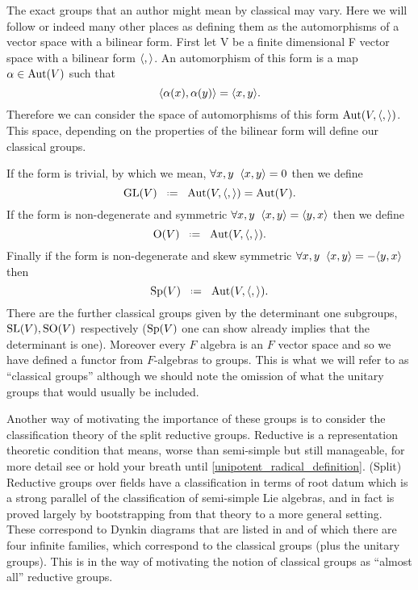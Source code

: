 The exact groups that an author might mean by classical may vary. Here we will follow \cite[\S 13]{CliffordAlgebrasClassical} or indeed many other places as defining them as the automorphisms of a vector space with a bilinear form. First let V be a finite dimensional F vector space with a bilinear form \(\langle ,\rangle\). An automorphism of this form is a map \(\alpha\in \operatorname{Aut}(V)\) such that 
\[\langle \alpha(x), \alpha(y)\rangle = \langle x,y\rangle.\]
Therefore we can consider the space of automorphisms of this form \(\operatorname{Aut}(V, \langle ,\rangle)\). This space, depending on the properties of the bilinear form will define our classical groups. 

If the form is trivial, by which we mean, \(\forall x,y \;\; \langle x, y\rangle = 0\) then we define 
\[\GL(V) \defeq \Aut(V, \inner{,}) = \Aut(V).\]
If the form is non-degenerate and symmetric \(\forall x,y \;\; \langle x, y\rangle = \langle y,x\rangle\) then we define
\[\mathrm{O}(V) \defeq \Aut(V, \inner{,}).\]
Finally if the form is non-degenerate and skew symmetric \(\forall x,y \;\; \langle x, y\rangle = -\langle y,x\rangle\) then 
\[\Sp(V) \defeq \Aut(V, \inner{,}).\]
There are the further classical groups given by the determinant one subgroups, \(\operatorname{SL}(V), \mathrm{SO}(V)\) respectively (\(\operatorname{Sp}(V)\) one can show already implies that the determinant is one). Moreover every \(F\) algebra is an \(F\) vector space and so we have defined a functor from \(F\)-algebras to groups. This is what we will refer to as ``classical groups'' although we should note the omission of what the unitary groups that  would usually be included.

Another way of motivating the importance of these groups is to consider the classification theory of the split reductive groups. Reductive is a representation theoretic condition that means, worse than semi-simple but still manageable, for more detail see \cite[22.138]{milneAlgebraicGroupsTheory2017} or hold your breath until \ref{unipotent_radical_definition}. (Split) Reductive groups over fields have a classification in terms of root datum \cite[22.48]{milneAlgebraicGroupsTheory2017} which is a strong parallel of the classification of semi-simple Lie algebras, and in fact is proved largely by bootstrapping from that theory to a more general setting. These correspond to Dynkin diagrams that are listed in \cite[Appendix A,B]{shahidiEisensteinSeriesAutomorphic2010} and of which there are four infinite families, which correspond to the classical groups (plus the unitary groups). This is in the way of motivating the notion of classical groups as ``almost all'' reductive groups.


